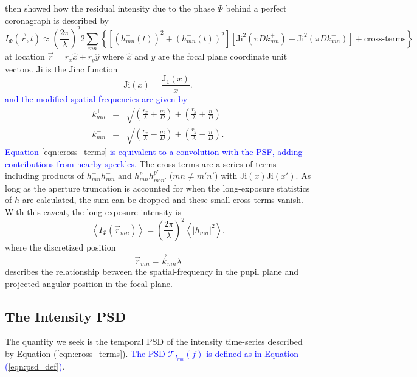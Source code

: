 \documentclass[10pt,preprint]{aastex631}
\newcommand{\jrmadd}[1]{\textcolor{blue}{#1}}
\newcommand{\Ji}{\mathrm{Ji}}
\begin{document}
\citet{2018JATIS...4a9001M} then showed how the residual intensity due to the phase $\Phi$ behind a perfect coronagraph is described by
\begin{equation}
I_\Phi(\vec{r},t) \approx \left(\frac{2\pi}{\lambda}\right)^2 2 \sum_{mn} \left\{  \left[ (h_{mn}^{+}(t))^2 + (h_{mn}^{-}(t))^2 \right] \left[ \Ji^2(\pi D k_{mn}^+) +\Ji^2(\pi D k_{mn}^-)\right] + \mbox{cross-terms} \right\}
\label{eqn:cross_terms}
\end{equation}
at location $\vec{r} = r_x \hat{x} + r_y\hat{y}$ where  $\hat{x}$ and  $\hat{y}$ are the focal plane coordinate unit vectors. $\Ji$ is the Jinc function
\begin{equation}
\Ji(x) = \frac{\mathrm{J}_1(x)}{x}.
\end{equation}
\jrmadd{and the modified spatial frequencies are given by} 
\begin{eqnarray}
k_{mn}^+ &=& \sqrt{\left(\frac{r_x}{\lambda} + \frac{m}{D}\right) + \left(\frac{r_y}{\lambda} + \frac{n}{D}\right)} \\ 
k_{mn}^- &=& \sqrt{\left(\frac{r_x}{\lambda} - \frac{m}{D}\right) + \left(\frac{r_y}{\lambda} - \frac{n}{D}\right)}. \nonumber
\end{eqnarray}
\jrmadd{Equation \ref{eqn:cross_terms} is equivalent to a convolution with the PSF, adding contributions from nearby speckles.}  The cross-terms are a series of terms including products of $h_{mn}^+h_{mn}^-$ and $h_{mn}^ph_{m'n'}^{p'}$ ($mn \neq m'n'$) with $\Ji(x)\Ji(x')$.  As long as the aperture truncation is accounted for when the long-exposure statistics of $h$ are calculated, the sum can be dropped and these small cross-terms vanish.  With this caveat, the long exposure intensity is 
\begin{equation}
\left< I_\Phi(\vec{r}_{mn}) \right> =  \left(\frac{2\pi}{\lambda}\right)^2\left< |h_{mn}|^2 \right> .
\label{eqn:contrast_h2}
\end{equation}
where the discretized position 
\begin{equation}
\vec{r}_{mn} = \vec{k}_{mn} \lambda
\end{equation}
describes the relationship between the spatial-frequency in the pupil plane and projected-angular position in the focal plane.

\subsection{The Intensity PSD}

The quantity we seek is the temporal PSD of the intensity time-series described by Equation (\ref{eqn:cross_terms}).  \jrmadd{The PSD $\mathcal{T}_{I_{mn}}(f)$ is defined as in Equation (\ref{eqn:psd_def})}.
\end{document}
